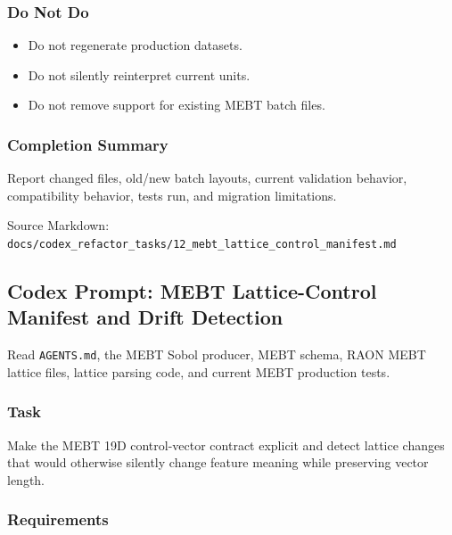 \documentclass[
]{article}
\providecommand{\tightlist}{%
  \setlength{\itemsep}{0pt}\setlength{\parskip}{0pt}}
\begin{document}
\hypertarget{do-not-do}{%
\subsubsection{Do Not Do}\label{do-not-do}}

\begin{itemize}
\tightlist
\item
  Do not regenerate production datasets.
\item
  Do not silently reinterpret current units.
\item
  Do not remove support for existing MEBT batch files.
\end{itemize}

\hypertarget{completion-summary}{%
\subsubsection{Completion Summary}\label{completion-summary}}

Report changed files, old/new batch layouts, current validation
behavior, compatibility behavior, tests run, and migration limitations.

Source Markdown:
\texttt{docs/codex\_refactor\_tasks/12\_mebt\_lattice\_control\_manifest.md}

\hypertarget{codex-prompt-mebt-lattice-control-manifest-and-drift-detection}{%
\subsection{Codex Prompt: MEBT Lattice-Control Manifest and Drift
Detection}\label{codex-prompt-mebt-lattice-control-manifest-and-drift-detection}}

Read \texttt{AGENTS.md}, the MEBT Sobol producer, MEBT schema, RAON MEBT
lattice files, lattice parsing code, and current MEBT production tests.

\hypertarget{task-11}{%
\subsubsection{Task}\label{task-11}}

Make the MEBT 19D control-vector contract explicit and detect lattice
changes that would otherwise silently change feature meaning while
preserving vector length.

\hypertarget{requirements-11}{%
\subsubsection{Requirements}\label{requirements-11}}
\end{document}
